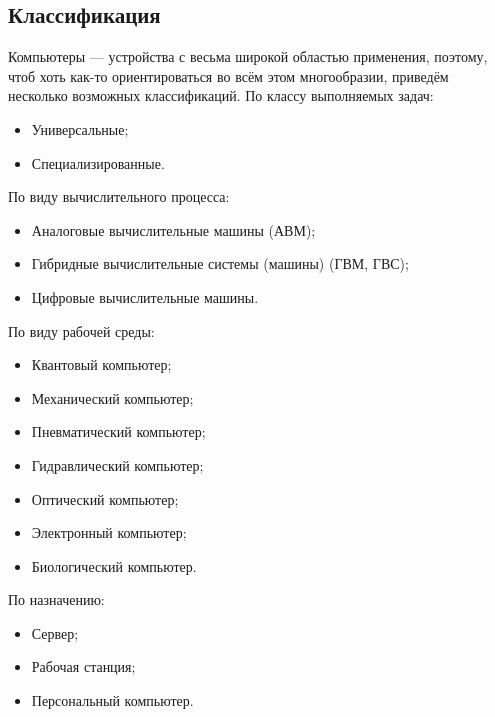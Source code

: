 \subsection{Классификация}\label{base:introduction:computer:classification}
Компьютеры --- устройства с весьма широкой областью применения, поэтому, чтоб хоть как-то ориентироваться во всём этом многообразии, приведём несколько возможных классификаций.
По классу выполняемых задач:
\begin{itemize}
 \item Универсальные;
 \item Специализированные.
\end{itemize}
По виду вычислительного процесса:
\begin{itemize}
 \item Аналоговые вычислительные машины (АВМ);
 \item Гибридные вычислительные системы (машины) (ГВМ, ГВС);
 \item Цифровые вычислительные машины.
\end{itemize}
По виду рабочей среды:
\begin{itemize}
 \item Квантовый компьютер;
 \item Механический компьютер;
 \item Пневматический компьютер;
 \item Гидравлический компьютер;
 \item Оптический компьютер;
 \item Электронный компьютер;
 \item Биологический компьютер.
\end{itemize}
По назначению:
\begin{itemize}
 \item Сервер;
 \item Рабочая станция;
 \item Персональный компьютер.
\end{itemize}

